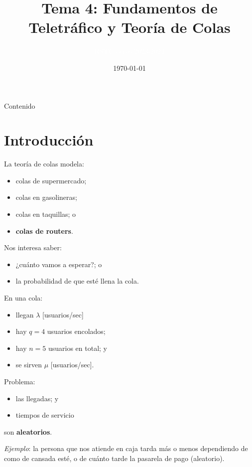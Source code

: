 \documentclass[xcolor={x11names}]{beamer}
\title[Tema 4]{Tema 4: Fundamentos de Teletráfico y Teoría de Colas}
\author{\textcolor{white}{RSTC curso 2023-2024}}
\date{\today}
\begin{document}
\frame{\titlepage }


\begin{frame}[allowframebreaks]{Contenido}
    \tableofcontents
\end{frame}




\section{Introducción}
\begin{frame}{\secname}
    La teoría de colas modela:
    \begin{itemize}
        \item colas de supermercado;
        \item colas en gasolineras;
        \item colas en taquillas; o
        \item \textbf{colas de routers}.
    \end{itemize}

    \vfill
    Nos interesa saber:
    \begin{itemize}
        \item ¿cuánto vamos a esperar?; o
        \item la probabilidad de que esté llena la cola.
    \end{itemize}
\end{frame}



\begin{frame}{\secname}
    \begin{figure}
        
    \end{figure}

    En una cola:
    \begin{itemize}
        \item llegan $\lambda$ [usuarios/sec]
        \item hay $q=4$ usuarios encolados;
        \item hay $n=5$ usuarios en total; y
        \item se sirven $\mu$ [usuarios/sec].
    \end{itemize}
\end{frame}


\begin{frame}{\secname}
    Problema:
    \begin{itemize}
        \item las llegadas; y
        \item tiempos de servicio
    \end{itemize}
    son \textbf{aleatorios}.

    \vfill

    \textit{Ejemplo}: la persona que nos
    atiende en caja tarda más o menos
    dependiendo de como de cansada esté,
    o de cuánto tarde la pasarela de pago
    (aleatorio).
\end{frame}
\end{document}
